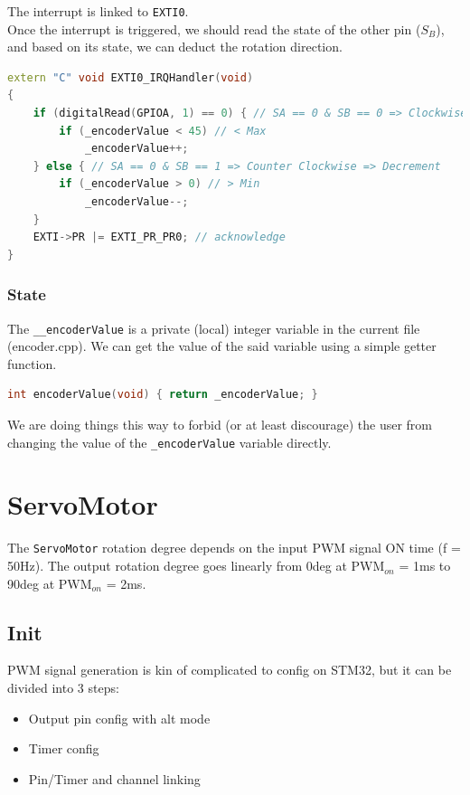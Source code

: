 \documentclass{article}
\begin{document}
The interrupt is linked to \verb|EXTI0|. \\
Once the interrupt is triggered, we should read the state of the other pin ($S_B$), and based on its state, we can deduct the rotation direction.

\begin{lstlisting}[language=C++, caption={EXTI0\_IRQHandler Implementation}]
extern "C" void EXTI0_IRQHandler(void)
{
    if (digitalRead(GPIOA, 1) == 0) { // SA == 0 & SB == 0 => Clockwise => Increment
        if (_encoderValue < 45) // < Max
            _encoderValue++; 
    } else { // SA == 0 & SB == 1 => Counter Clockwise => Decrement
        if (_encoderValue > 0) // > Min
            _encoderValue--; 
    }
    EXTI->PR |= EXTI_PR_PR0; // acknowledge
}
\end{lstlisting}

\subsubsection{State}

The \verb|__encoderValue| is a private (local) integer variable in the current file (encoder.cpp). We can get the value of the said variable using a simple getter function.

\begin{lstlisting}[language=C++, caption={\_encoderValue getter}]
int encoderValue(void) { return _encoderValue; }
\end{lstlisting}


We are doing things this way to forbid (or at least discourage) the user from changing the value of the \verb|_encoderValue| variable directly.

\section{ServoMotor}

The \verb|ServoMotor| rotation degree depends on the input PWM signal ON time (f = 50Hz). The output rotation degree goes linearly from 0deg at PWM$_{on}$ = 1ms to 90deg at PWM$_{on}$ = 2ms.

\subsection{Init}

PWM signal generation is kin of complicated to config on STM32, but it can be divided into 3 steps:

\begin{itemize}
    \item Output pin config with alt mode
    \item Timer config
    \item Pin/Timer and channel linking
\end{itemize}
\end{document}
